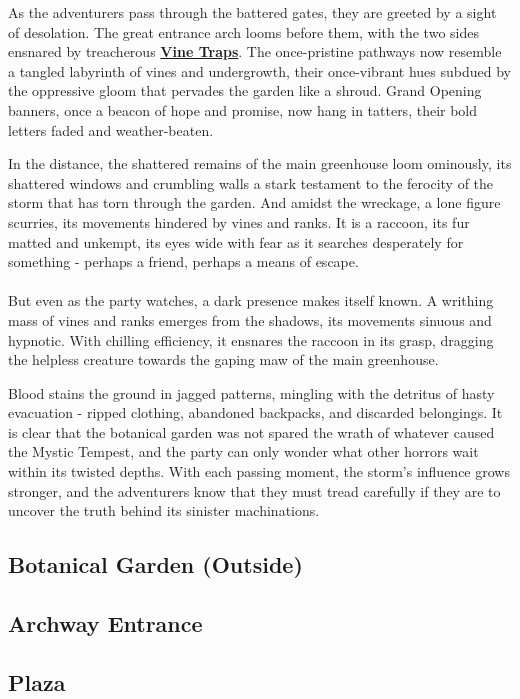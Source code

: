 As the adventurers pass through the battered gates, they are greeted by a sight of desolation. The great entrance arch looms before them, with the two sides ensnared by treacherous \hyperref[sec:VineTrap]{\textbf{Vine Traps}}. The once-pristine pathways now resemble a tangled labyrinth of vines and undergrowth, their once-vibrant hues subdued by the oppressive gloom that pervades the garden like a shroud. Grand Opening banners, once a beacon of hope and promise, now hang in tatters, their bold letters faded and weather-beaten.

In the distance, the shattered remains of the main greenhouse loom ominously, its shattered windows and crumbling walls a stark testament to the ferocity of the storm that has torn through the garden. And amidst the wreckage, a lone figure scurries, its movements hindered by vines and ranks. It is a raccoon, its fur matted and unkempt, its eyes wide with fear as it searches desperately for something - perhaps a friend, perhaps a means of escape.\\\hfill\\

But even as the party watches, a dark presence makes itself known. A writhing mass of vines and ranks emerges from the shadows, its movements sinuous and hypnotic. With chilling efficiency, it ensnares the raccoon in its grasp, dragging the helpless creature towards the gaping maw of the main greenhouse.

Blood stains the ground in jagged patterns, mingling with the detritus of hasty evacuation - ripped clothing, abandoned backpacks, and discarded belongings. It is clear that the botanical garden was not spared the wrath of whatever caused the Mystic Tempest, and the party can only wonder what other horrors wait within its twisted depths. With each passing moment, the storm's influence grows stronger, and the adventurers know that they must tread carefully if they are to uncover the truth behind its sinister machinations.

\subsection*{Botanical Garden (Outside)}

\subsection*{Archway Entrance}
\subsection*{Plaza}
